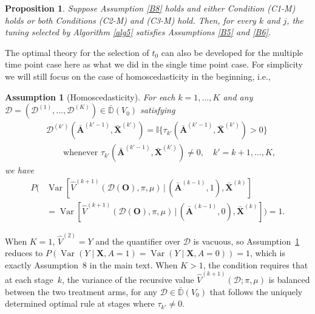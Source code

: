 \documentclass[11pt]{article}
\theoremstyle{referenceplain}
\newtheorem{proposition}{Proposition}[section]
\newtheorem{assumption}{Assumption}
\theoremstyle{referencedefinition}
\theoremstyle{referenceremark}
\begin{document}
\begin{proposition}\label{propb2}
Suppose Assumption \ref{B8} holds and either Condition (C1-M) holds or both Conditions (C2-M) and (C3-M) hold. Then, for every $k$ and $j$, the tuning selected by Algorithm \ref{alg5} satisfies Assumptions \ref{B5} and \ref{B6}.
\end{proposition}
 
 The optimal theory for the selection of $t_0$ can also be developed for the multiple time point case here as what we did in the single time point case.  For simplicity we will still focus on the case of homoscedasticity in the beginning, i.e., 
\begin{assumption}[Homoscedasticity]\label{B9}
For each $k=1,\dots,K$ and any 
$\mathcal{D}=(\mathcal{D}^{(1)},\dots,
\mathcal{D}^{(K)})\in\bar{\mathbb{D}}(V_0)$ satisfying 
\begin{align*}
&\mathcal{D}^{(k')}(\bar{\mathbf{A}}^{(k'-1)},
\bar{\mathbf{X}}^{(k')})
=\mathbb{I}\{\tau_{k'}(\bar{\mathbf{A}}^{(k'-1)},
\bar{\mathbf{X}}^{(k')})>0\}\\
&\qquad\text{whenever } \tau_{k'}(\bar{\mathbf{A}}^{(k'-1)},
\bar{\mathbf{X}}^{(k')})\neq 0, \quad k'=k+1,\dots,K,
\end{align*}
we have
\begin{align*}
    P\bigg(&\operatorname{Var}\!\left[\widehat{V}^{(k+1)}
    (\mathcal{D}(\mathbf{O}),\pi,\mu)\,\Big|\,
    (\bar{\mathbf{A}}^{(k-1)},1), \bar{\mathbf{X}}^{(k)}
    \right]\\
    &=\operatorname{Var}\!\left[\widehat{V}^{(k+1)}
    (\mathcal{D}(\mathbf{O}),\pi,\mu)\,\Big|\,
    (\bar{\mathbf{A}}^{(k-1)},0), \bar{\mathbf{X}}^{(k)}
    \right]\bigg)=1.
\end{align*}
\end{assumption}
When $K=1$, $\widehat{V}^{(2)}=Y$ and the quantifier over 
$\mathcal{D}$ is vacuous, so Assumption~\ref{B9} reduces to 
$P(\operatorname{Var}(Y\mid\mathbf{X},A=1)
=\operatorname{Var}(Y\mid\mathbf{X},A=0))=1$, which is exactly Assumption~8 in the main text. When $K>1$, the condition requires that at each stage~$k$, the variance of the recursive value 
$\widehat{V}^{(k+1)}(\mathcal{D};\pi,\mu)$ is balanced between the two treatment arms, for any 
$\mathcal{D}\in\bar{\mathbb{D}}(V_0)$ that follows the uniquely determined optimal rule at stages where $\tau_{k'}\neq 0$.
\end{document}
